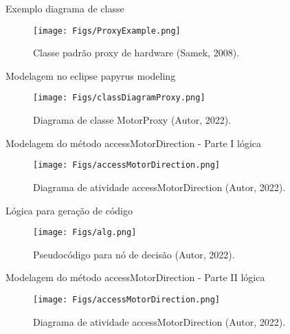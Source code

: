 \documentclass[handout,aspectratio = 169]{beamer}
\begin{document}
\begin{frame}{Exemplo diagrama de classe}
    \begin{figure}
            \centering
             \texttt{[image: Figs/ProxyExample.png]}
            \caption{Classe padrão proxy de hardware (Samek, 2008).}
        \end{figure}
\end{frame}

\begin{frame}{Modelagem no eclipse papyrus modeling}
    \begin{figure}
            \centering
             \texttt{[image: Figs/classDiagramProxy.png]}
            \caption{Diagrama de classe MotorProxy (Autor, 2022).}
        \end{figure}
\end{frame}

\begin{frame}{Modelagem do método accessMotorDirection - Parte I lógica}
    \begin{figure}
            \centering
             \texttt{[image: Figs/accessMotorDirection.png]}
            \caption{Diagrama de atividade accessMotorDirection (Autor, 2022).}
        \end{figure}
\end{frame}

\begin{frame}{Lógica para geração de código}
    \begin{figure}
            \centering
             \texttt{[image: Figs/alg.png]}
            \caption{Pseudocódigo para nó de decisão (Autor, 2022).}
        \end{figure}
\end{frame}

\begin{frame}{Modelagem do método accessMotorDirection - Parte II lógica}
    \begin{figure}
            \centering
             \texttt{[image: Figs/accessMotorDirection.png]}
            \caption{Diagrama de atividade accessMotorDirection (Autor, 2022).}
        \end{figure}
\end{frame}


\end{document}
